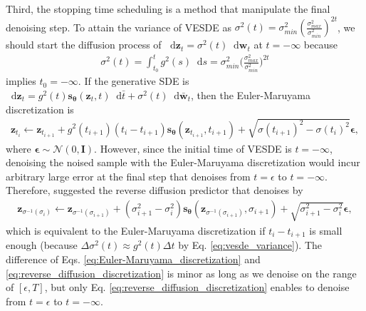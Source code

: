 \documentclass{article}
\theoremstyle{definition}
\theoremstyle{remark}
\newcommand*\diff{\mathop{}\!\mathrm{d}}
\begin{document}
	Third, the stopping time scheduling is a method that manipulate the final denoising step. To attain the variance of VESDE as $\sigma^{2}(t)=\sigma_{min}^{2}(\frac{\sigma_{max}^{2}}{\sigma_{min}^{2}})^{2t}$, we should start the diffusion process of $\diff\mathbf{z}_{t}=\sigma^{2}(t)\diff\mathbf{w}_{t}$ at $t=-\infty$ because 
	\begin{align}\label{eq:vesde_variance}
	\sigma^{2}(t)=\int_{t_{0}}^{t}g^{2}(s)\diff s=\sigma_{min}^{2}\Big(\frac{\sigma_{max}^{2}}{\sigma_{min}^{2}}\Big)^{2t}
	\end{align}
	implies $t_{0}=-\infty$. If the generative SDE is $\diff\mathbf{z}_{t}=g^{2}(t)\mathbf{s}_{\bm{\theta}}(\mathbf{z}_{t},t)\diff \bar{t}+\sigma^{2}(t)\diff\mathbf{\bar{w}}_{t}$, then the Euler-Maruyama discretization is 
	\begin{align}\label{eq:Euler-Maruyama_discretization}
	\mathbf{z}_{t_{i}}\leftarrow\mathbf{z}_{t_{i+1}}+g^{2}(t_{i+1})(t_{i}-t_{i+1})\mathbf{s}_{\bm{\theta}}(\mathbf{z}_{t_{i+1}},t_{i+1})+\sqrt{\sigma(t_{i+1})^{2}-\sigma(t_{i})^{2}}\bm{\epsilon},
	\end{align}
	where $\bm{\epsilon}\sim\mathcal{N}(0,\mathbf{I})$. However, since the initial time of VESDE is $t=-\infty$, denoising the noised sample with the Euler-Maruyama discretization would incur arbitrary large error at the final step that denoises from $t=\epsilon$ to $t=-\infty$. Therefore, \citet{song2020score} suggested the reverse diffusion predictor that denoises by
	\begin{align}\label{eq:reverse_diffusion_discretization}
	\mathbf{z}_{\sigma^{-1}(\sigma_{i})}\leftarrow\mathbf{z}_{\sigma^{-1}(\sigma_{i+1})}+(\sigma_{i+1}^{2}-\sigma_{i}^{2})\mathbf{s}_{\bm{\theta}}(\mathbf{z}_{\sigma^{-1}(\sigma_{i+1})},\sigma_{i+1})+\sqrt{\sigma_{i+1}^{2}-\sigma_{i}^{2}}\bm{\epsilon},
	\end{align}
	which is equivalent to the Euler-Maruyama discretization if $t_{i}-t_{i+1}$ is small enough (because $\Delta \sigma^{2}(t)\approx g^{2}(t)\Delta t$ by Eq. \eqref{eq:vesde_variance}). The difference of Eqs. \eqref{eq:Euler-Maruyama_discretization} and \eqref{eq:reverse_diffusion_discretization} is minor as long as we denoise on the range of $[\epsilon,T]$, but only Eq. \eqref{eq:reverse_diffusion_discretization} enables to denoise from $t=\epsilon$ to $t=-\infty$.
	
\end{document}
